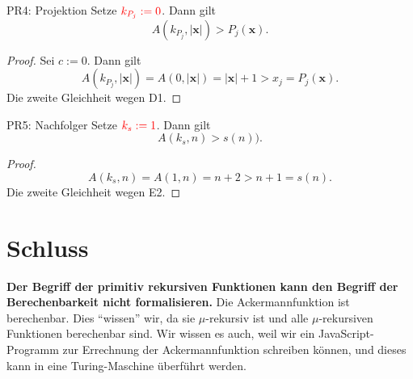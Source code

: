 \documentclass[a4paper]{amsart}
\theoremstyle{definition}
\newcommand{\bb}[1]{\mathbf{#1}}
\begin{document}
\begin{Theorem}{PR4: Projektion}
    Setze $\color{red}{k_{P_j} := 0}$. Dann gilt
    \begin{equation*}
        A( k_{P_j}, |\bb{x}| ) > P_j(\bb{x}).
    \end{equation*}
\end{Theorem}
\begin{proof}
    Sei $c :=0$. Dann gilt
    \begin{equation*}
       A( k_{P_j}, |\bb{x}| ) =  A( 0, |\bb{x}| ) = |\bb{x}| + 1 > x_j = P_j(\bb{x}).
    \end{equation*}
    Die zweite Gleichheit wegen D1.
\end{proof}

\begin{Theorem}{PR5: Nachfolger}
    Setze $\color{red}{k_s := 1}$. Dann gilt
    \begin{equation*}
        A( k_s, n ) > s(n)).
    \end{equation*}
\end{Theorem}
\begin{proof}
    \begin{equation*}
        A( k_s, n ) =  A( 1, n ) = n+2 > n+1 = s(n).
    \end{equation*}
    Die zweite Gleichheit wegen E2.
\end{proof}


\section{Schluss}
\textbf{Der Begriff der primitiv rekursiven Funktionen kann den Begriff der Berechenbarkeit nicht formalisieren.}
Die Ackermannfunktion ist berechenbar. Dies "`wissen"' wir, da sie $\mu$-rekursiv ist und alle
$\mu$-rekursiven Funktionen berechenbar sind. Wir wissen es auch, weil wir ein JavaScript-Programm
zur Errechnung der Ackermannfunktion schreiben können, und dieses kann in eine Turing-Maschine 
überführt werden.
\end{document}
